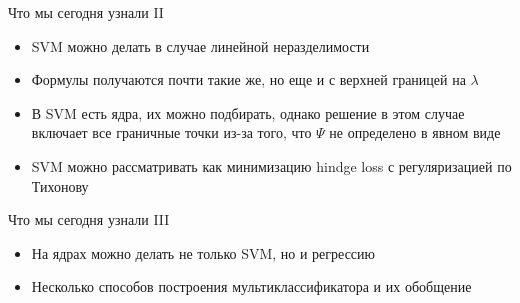 \documentclass[14pt, fleqn, xcolor={dvipsnames, table}]{beamer}
\begin{document}
\begin{frame}{Что мы сегодня узнали II}
\small
\begin{itemize}
  \item SVM можно делать в случае линейной неразделимости
  \item Формулы получаются почти такие же, но еще и с верхней границей на $\lambda$
  \item В SVM есть ядра, их можно подбирать, однако решение в этом случае включает все граничные точки из-за того, что $\Psi$ не определено в явном виде
  \item SVM можно рассматривать как минимизацию hindge loss с регуляризацией по Тихонову
\end{itemize}
\end{frame}

\begin{frame}{Что мы сегодня узнали III}
\begin{itemize}
  \item На ядрах можно делать не только SVM, но и регрессию
  \item Несколько способов построения мультиклассификатора и их обобщение
\end{itemize}
\end{frame}
\end{document}
